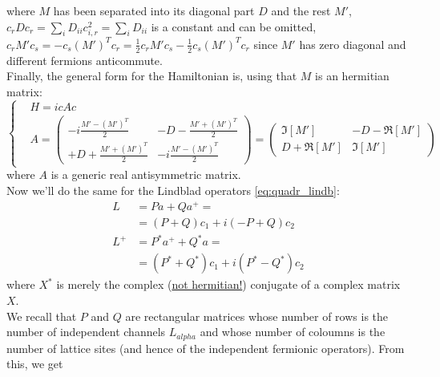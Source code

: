 \documentclass[a4paper,11pt]{article}
\newcommand{\ubar}[1]{\underline{#1}}
\begin{document}
   where $M$ has been separated into its diagonal part $D$ and the rest $\displaystyle M'$, $c_rDc_r = \sum_iD_{ii}c_{i,r}^2 = \sum_i D_{ii}$ is a constant and can be omitted, $\displaystyle c_rM'c_s = - c_s(M')^Tc_r = \frac{1}{2}c_rM'c_s - \frac{1}{2}c_s(M')^Tc_r$ since $M'$ has zero diagonal and different fermions anticommute.\\ Finally, the general form for the Hamiltonian is, using that $M$ is an hermitian matrix:
    \begin{equation}
    \label{eq:quadr_ham_majorana}
     \left\{
     \begin{aligned}
     & H = icAc\\
     & A = \left(
     \begin{array}{cc}
       -i\frac{M'-(M')^T}{2} & -D - \frac{M'+(M')^T}{2} \\
       + D + \frac{M'+(M')^T}{2} & -i \frac{M'-(M')^T}{2}
        \end{array}
        \right)
      =\left( 
      \begin{array}{cc}
        \Im[M'] & -D-\Re[M']\\
        D+\Re[M'] & \Im[M']
        \end{array}
        \right)
      \end{aligned}
      \right .
     \end{equation}
where $A$ is a generic real antisymmetric matrix.\\[0.3cm] Now we'll do the same for the Lindblad operators \ref{eq:quadr_lindb}:
\begin{align*}
 L &= P a + Q a^+=\\
   &= (P+Q)c_1 +i(-P+Q)c_2\\
 L^+&= P^*a^++Q^*a=\\
   &= (P^*+Q^*)c_1+i(P^*-Q^*)c_2  
\end{align*} 
where $X^*$ is merely the complex (\ubar{not hermitian!}) conjugate of a complex matrix $X$. \\We recall that $P$ and $Q$ are rectangular matrices whose number of rows is the number of independent channels $L_{alpha}$ and whose number of coloumns is the number of lattice sites (and hence of the independent fermionic operators). From this, we get
\end{document}
